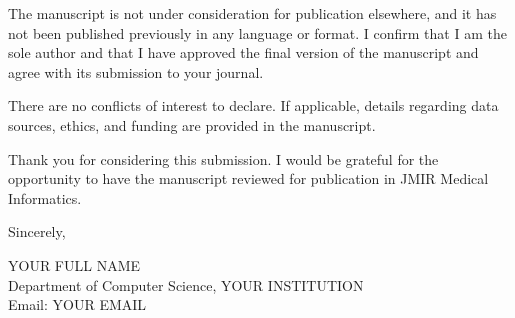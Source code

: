 \documentclass[12pt]{article}
\begin{document}
The manuscript is not under consideration for publication elsewhere, and it has not been published previously in any language or format. I confirm that I am the sole author and that I have approved the final version of the manuscript and agree with its submission to your journal.

There are no conflicts of interest to declare. If applicable, details regarding data sources, ethics, and funding are provided in the manuscript.

Thank you for considering this submission. I would be grateful for the opportunity to have the manuscript reviewed for publication in JMIR Medical Informatics.

\bigskip

Sincerely,

\bigskip

YOUR FULL NAME\\
Department of Computer Science, YOUR INSTITUTION\\
Email: YOUR EMAIL
\end{document}
